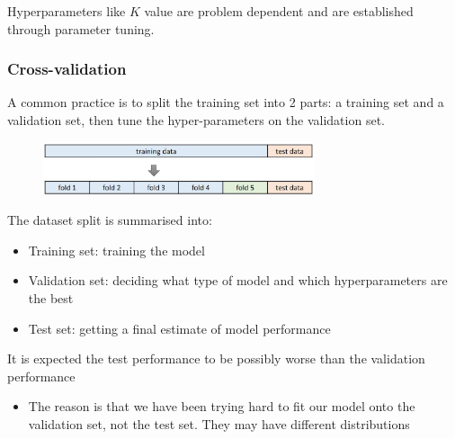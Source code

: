 \documentclass{report}
\begin{document}
Hyperparameters like $K$ value are problem dependent and are established through
parameter tuning.

\subsubsection{Cross-validation}

A common practice is to split the training set into 2 parts: a training set and
a validation set, then tune the hyper-parameters on the validation set.
\begin{figure}[h]
    \centering
    \includegraphics[width=8cm]{cross.JPG}
\end{figure}

The dataset split is summarised into:
\begin{itemize}
    \item Training set: training the model
    \item Validation set: deciding what type of model and which hyperparameters are the
    best
    \item Test set: getting a final estimate of model performance
\end{itemize}

It is expected the test performance to be possibly worse than the validation
performance
\begin{itemize}
    \item The reason is that we have been trying hard to fit our model onto the validation set,
    not the test set. They may have different distributions
\end{itemize}
\end{document}
